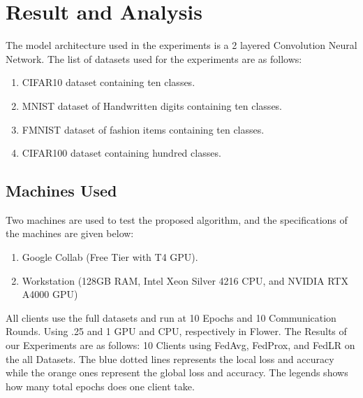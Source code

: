 \documentclass[conference]{IEEEtran}
\begin{document}
\section{Result and Analysis}
The model architecture used in the experiments is a 2 layered Convolution Neural Network. The list of datasets used for the experiments are as follows:
\begin{enumerate}
    \item CIFAR10 \cite{cifar10} dataset containing ten classes.
    \item MNIST \cite{lecun1998mnist} dataset of Handwritten digits containing ten classes. 
    \item FMNIST \cite{xiao2017fashionmnistnovelimagedataset} dataset of fashion items containing ten classes.
    \item CIFAR100 \cite{Krizhevsky09learningmultiple} dataset containing hundred classes. 
\end{enumerate}
\subsection{Machines Used}
Two machines are used to test the proposed algorithm, and the specifications of the machines are given below:
\begin{enumerate}
	\item Google Collab (Free Tier with T4 GPU).
	\item Workstation (128GB RAM, Intel Xeon Silver 4216 CPU, and NVIDIA RTX A4000 GPU)
\end{enumerate}

All clients use the full datasets and run at 10 Epochs and 10 Communication Rounds. Using .25 and 1 GPU and CPU, respectively in Flower. The Results of our Experiments are as follows:
10 Clients using FedAvg, FedProx, and FedLR on the all Datasets. The blue dotted lines represents the local loss and accuracy while the orange ones represent the global loss and accuracy. The legends shows how many total epochs does one client take.

%
\end{document}
